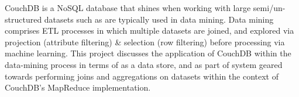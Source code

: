 CouchDB is a NoSQL database that shines when working with large semi/un-structured datasets such as are typically used in data mining. Data mining comprises ETL processes in which multiple datasets are joined, and explored via projection (attribute filtering) \& selection (row filtering) before processing via machine learning. This project discusses the application of CouchDB within the data-mining process in terms of as a data store, and as part of system geared towards performing joins and aggregations on datasets within the context of CouchDB's MapReduce implementation.
